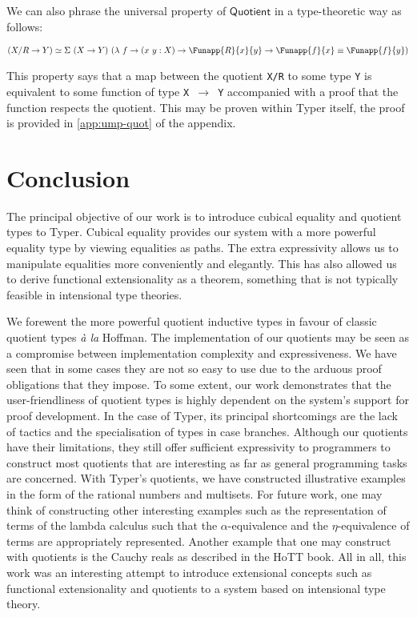 \documentclass[12pt,twoside,maitrise]{dms}
\theoremstyle{definition}
\numberwithin{equation}{section}
\numberwithin{table}{chapter}
\numberwithin{figure}{chapter}
\newcommand\kw[1] {\textsf{#1}}
\newcommand\id[1] {\texttt{#1}}
\newcommand\fn[1] {\texttt{#1}}
\newcommand\latinphrase{\textit}
\begin{document}
We can also phrase the universal property of $\kw{Quotient}$ in a type-theoretic
way as follows:

\begin{align*}
  & (X/R \rightarrow Y) \simeq \Sigma \ (X \rightarrow Y) \ (\lambda \ f \rightarrow (x \ y : X) \rightarrow \Funapp{R}{x}{y} \rightarrow \Funapp{f}{x} \equiv \Funapp{f}{y}) \\
\end{align*}

This property says that a map between the quotient \fn{X/R} to some type \id{Y}
is equivalent to some function of type \fn{X $\rightarrow$ Y} accompanied with a
proof that the function respects the quotient. This may be proven within Typer
itself, the proof is provided in \autoref{app:ump-quot} of the appendix.

\chapter{Conclusion}

The principal objective of our work is to introduce cubical equality and
quotient types to Typer. Cubical equality provides our system with a more
powerful equality type by viewing equalities as paths. The extra expressivity
allows us to manipulate equalities more conveniently and elegantly. This has
also allowed us to derive functional extensionality as a theorem, something that
is not typically feasible in intensional type theories.

We forewent the more powerful quotient inductive types in favour of classic
quotient types \latinphrase{à la} Hoffman. The implementation of our quotients
may be seen as a compromise between implementation complexity and
expressiveness. We have seen that in some cases they are not so easy to use due
to the arduous proof obligations that they impose. To some extent, our work
demonstrates that the user-friendliness of quotient types is highly dependent on
the system's support for proof development. In the case of Typer, its principal
shortcomings are the lack of tactics and the specialisation of types in case
branches. Although our quotients have their limitations, they still offer
sufficient expressivity to programmers to construct most quotients that are
interesting as far as general programming tasks are concerned. With Typer's
quotients, we have constructed illustrative examples in the form of the rational
numbers and multisets. For future work, one may think of constructing other
interesting examples such as the representation of terms of the lambda calculus
such that the $\alpha$-equivalence and the $\eta$-equivalence of terms are
appropriately represented. Another example that one may construct with quotients
is the Cauchy reals as described in the HoTT book\cite[Chap. 11.3.1]{HoTTbook}.
All in all, this work was an interesting attempt to introduce extensional
concepts such as functional extensionality and quotients to a system based on
intensional type theory.
\end{document}
